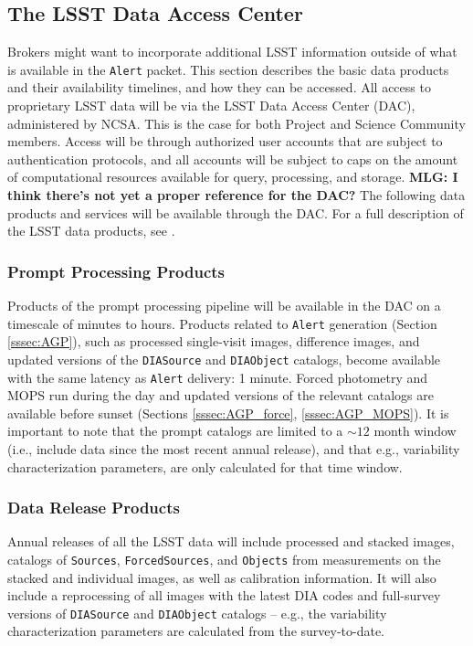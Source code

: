 \subsection{The LSST Data Access Center}

Brokers might want to incorporate additional LSST information outside of what is available in the {\tt Alert} packet. This section describes the basic data products and their availability timelines, and how they can be accessed. All access to proprietary LSST data will be via the LSST Data Access Center (DAC), administered by NCSA. This is the case for both Project and Science Community members. Access will be through authorized user accounts that are subject to authentication protocols, and all accounts will be subject to caps on the amount of computational resources available for query, processing, and storage. {\bf MLG: I think there's not yet a proper reference for the DAC?} The following data products and services will be available through the DAC. For a full description of the LSST data products, see .

\subsubsection{Prompt Processing Products}

Products of the prompt processing pipeline will be available in the DAC on a timescale of minutes to hours. Products related to {\tt Alert} generation (Section \ref{sssec:AGP}), such as processed single-visit images, difference images, and updated versions of the {\tt DIASource} and {\tt DIAObject} catalogs, become available with the same latency as {\tt Alert} delivery: 1 minute. Forced photometry and MOPS run during the day and updated versions of the relevant catalogs are available before sunset (Sections \ref{sssec:AGP_force}, \ref{sssec:AGP_MOPS}). It is important to note that the prompt catalogs are limited to a $\sim12$ month window (i.e., include data since the most recent annual release), and that e.g., variability characterization parameters, are only calculated for that time window.

\subsubsection{Data Release Products}

Annual releases of all the LSST data will include processed and stacked images, catalogs of {\tt Sources}, {\tt ForcedSources}, and {\tt Objects} from measurements on the stacked and individual images, as well as calibration information. It will also include a  reprocessing of all images with the latest DIA codes and full-survey versions of {\tt DIASource} and {\tt DIAObject} catalogs -- e.g., the variability characterization parameters are calculated from the survey-to-date.

